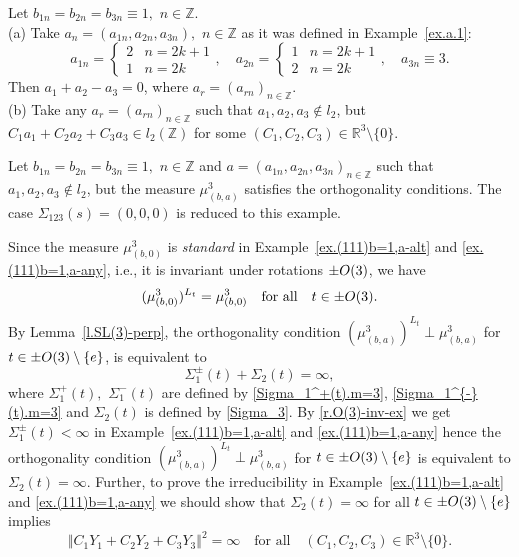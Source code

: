 \documentclass[preprint,12pt]{elsarticle}
\numberwithin{equation}{section}
\begin{document}
\begin{ex}
 \label{ex.(111)b=1,a-alt}
Let $b_{1n}=b_{2n}=b_{3n}\equiv 1,\,\,n\in \mathbb Z$. \\
(a) Take  $a_n=(a_{1n},a_{2n},a_{3n}),\,\,n\in \mathbb Z$ as it was defined in Example~\ref{ex.a.1}: 
\begin{equation*}
a_{1n}=  \left\{\begin{array}{ll}
 2&n=2k+1\\
 1&n=2k
\end{array}\right.,\quad
a_{2n}=  \left\{\begin{array}{ll}
 1&n=2k+1\\
 2&n=2k
\end{array}\right.,\quad a_{3n}\equiv 3.
\end{equation*}
Then $a_1+a_2-a_3=0$, where $a_{r}=(a_{rn})_{n\in \mathbb Z}$.\\
(b) Take any $a_{r}=(a_{rn})_{n\in \mathbb Z}$ such that 
$a_1,a_2,a_3\not\in l_2$, but $C_1a_1+C_2a_2+C_3a_3\in l_2(\mathbb Z)$ for some $(C_1,C_2,C_3)\in  {\mathbb R}^3\setminus\{0\}$.
%
 \end{ex}
\begin{ex}
 \label{ex.(111)b=1,a-any}
Let  $b_{1n}=b_{2n}=b_{3n}\equiv 1,\,\,n\in \mathbb Z$ and $a=(a_{1n},a_{2n},a_{3n})_{n\in \mathbb Z}$  such that $a_1,a_2,a_3\not\in l_2$, 
but 
the measure $\mu_{(b,a)}^3$ satisfies 
the orthogonality conditions. 
The case 
$\Sigma_{123}(s)=(0,0,0)$ is reduced to this example.
 \end{ex}
\begin{rem}
\label{r.(111)-ex}
Since the measure $\mu_{(b,0)}^3$ is {\it standard} in Example~\ref{ex.(111)b=1,a-alt} and \ref{ex.(111)b=1,a-any}, i.e.,
it is invariant under rotations $\pm{\rm O}(3)$, we have 
\begin{equation}
 \label{r.O(3)-inv-ex}
(\mu_{(b,0)}^3)^{L_t}=\mu_{(b,0)}^3\quad \text{for all}\quad t\in \pm{\rm O}(3).
\end{equation}
By Lemma~\ref{l.SL(3)-perp}, the orthogonality condition 
 $(\mu_{(b,a)}^3)^{L_t}\perp\mu_{(b,a)}^3$ for 
$t\in \pm{\rm O}(3)
\setminus\{e\}$, 
is equivalent to  $$\Sigma^\pm_1(t)+\Sigma_2(t)=\infty,$$
where $\Sigma_1^+(t),\,\,\Sigma_1^{-}(t)$ are defined by \eqref{Sigma_1^+(t).m=3}, 
 \eqref{Sigma_1^{-}(t).m=3} and  $\Sigma_2(t)$  is defined by \eqref{Sigma_3}. 
By \eqref{r.O(3)-inv-ex} we get $\Sigma^\pm_1(t)<\infty$ in Example~\ref{ex.(111)b=1,a-alt} and \ref{ex.(111)b=1,a-any} hence the orthogonality condition 
 $(\mu_{(b,a)}^3)^{L_t}\perp\mu_{(b,a)}^3$ for 
$t\in \pm{\rm O}(3)
\setminus\{e\}$ is equivalent to $\Sigma_2(t)=\infty$.
Further, to prove the irreducibility in
Example~\ref{ex.(111)b=1,a-alt} and
\ref{ex.(111)b=1,a-any} we should show that $\Sigma_2(t)=\infty$ for all
$t\in \pm{\rm O}(3)\setminus\{e\}$
implies  $$\Vert C_1Y_1+ C_2Y_2+C_3Y_3\Vert^2=\infty\quad \text{for all} \quad(C_1,C_2,C_3)\in 
 {\mathbb R}^3\setminus\{0\}.$$
\end{rem}
\end{document}
